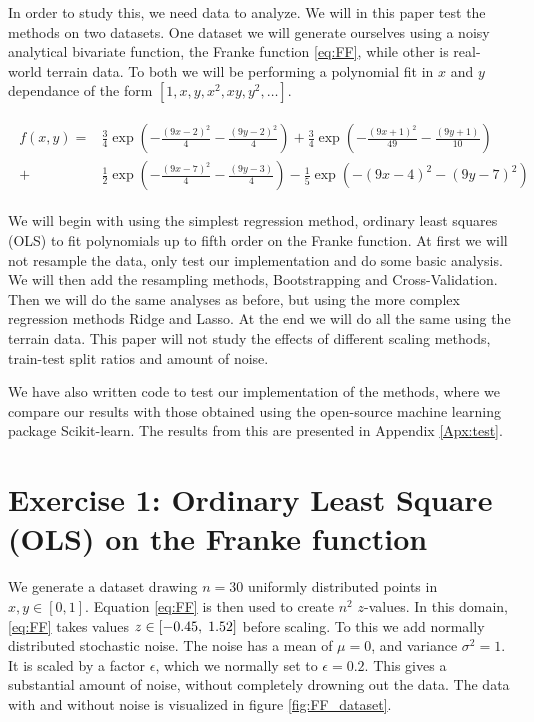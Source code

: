 \documentclass[reprint,english,notitlepage,aps,nobalancelastpage,nofootinbib]{revtex4-1}  %
\begin{document}
In order to study this, we need data to analyze. We will in this paper test the methods on two datasets. One dataset we will generate ourselves using a noisy analytical bivariate function, the Franke function \eqref{eq:FF}, while other is real-world terrain data. To both we will be performing a polynomial fit in $x$ and $y$ dependance of the form $[1, x, y, x^2, xy, y^2, \dots]$.

\begin{align}
	\begin{split}\label{eq:FF}
		f(x,y) = &\frac{3}{4}\exp(-\frac{(9x -2)^2}{4} - \frac{(9y-2)^2}{4}) + \frac{3}{4}\exp(-\frac{(9x + 1)^2}{49} - \frac{(9y + 1)}{10})
		\\
		+ &\frac{1}{2}\exp(-\frac{(9x-7)^2}{4} - \frac{(9y -3)}{4}) - \frac{1}{5}\exp(-(9x-4)^2 - (9y-7)^2)
	\end{split}
\end{align}

We will begin with using the simplest regression method, ordinary least squares (OLS) to fit polynomials up to fifth order on the Franke function. At first we will not resample the data, only test our implementation and do some basic analysis. We will then add the resampling methods, Bootstrapping and Cross-Validation. Then we will do the same analyses as before, but using the more complex regression methods Ridge and Lasso. At the end we will do all the same using the terrain data. This paper will not study the effects of different scaling methods, train-test split ratios and amount of noise.

We have also written code to test our implementation of the methods, where we compare our results with those obtained using the open-source machine learning package Scikit-learn. The results from this are presented in Appendix \ref{Apx:test}.



\section*{Exercise 1: Ordinary Least Square (OLS) on the Franke function}

We generate a dataset drawing $n=30$ uniformly distributed points in $x, y \in[0, 1]$. Equation \eqref{eq:FF} is then used to create $n^2$ \(z\)-values. In this domain, \eqref{eq:FF} takes values \(z\in[-0.45, \hspace{1mm} 1.52]\) before scaling. To this we add normally distributed stochastic noise. The noise has a mean of $\mu=0$, and variance $\sigma^2=1$. It is scaled by a factor $\epsilon$, which we normally set to $\epsilon=0.2$. This gives a substantial amount of noise, without completely drowning out the data. The data with and without noise is visualized in figure \ref{fig:FF_dataset}.
\end{document}

